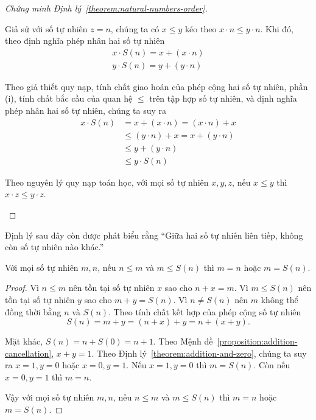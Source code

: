 \begin{proof}[Chứng minh Định lý~\ref{theorem:natural-numbers-order}]
\begin{enumerate}[label={(\roman*)}]
		      Giả sử với số tự nhiên $z = n$, chúng ta có $x\leq y$ kéo theo $x\cdot n\leq y\cdot n$. Khi đó, theo định nghĩa phép nhân hai số tự nhiên
		      \[
			      \begin{split}
				      x\cdot S(n) = x + (x\cdot n) \\
				      y\cdot S(n) = y + (y\cdot n)
			      \end{split}
		      \]

		      Theo giả thiết quy nạp, tính chất giao hoán của phép cộng hai số tự nhiên, phần (i), tính chất bắc cầu của quan hệ $\leq$ trên tập hợp số tự nhiên, và định nghĩa phép nhân hai số tự nhiên, chúng ta suy ra
		      \begin{align*}
			      x\cdot S(n) & = x + (x\cdot n) = (x\cdot n) + x    \\
			                  & \leq (y\cdot n) + x = x + (y\cdot n) \\
			                  & \leq y + (y\cdot n)                  \\
			                  & \leq y\cdot S(n)
		      \end{align*}

		      Theo nguyên lý quy nạp toán học, với mọi số tự nhiên $x, y, z$, nếu $x\leq y$ thì $x\cdot z\leq y\cdot z$.
	\end{enumerate}
\end{proof}

Định lý sau đây còn được phát biểu rằng ``Giữa hai số tự nhiên liên tiếp, không còn số tự nhiên nào khác.''
\begin{theorem}
	Với mọi số tự nhiên $m, n$, nếu $n\leq m$ và $m \leq S(n)$ thì $m = n$ hoặc $m = S(n)$.
\end{theorem}

\begin{proof}
	Vì $n\leq m$ nên tồn tại số tự nhiên $x$ sao cho $n + x = m$. Vì $m\leq S(n)$ nên tồn tại số tự nhiên $y$ sao cho $m + y = S(n)$. Vì $n\ne S(n)$ nên $m$ không thể đồng thời bằng $n$ và $S(n)$. Theo tính chất kết hợp của phép cộng số tự nhiên
	\[
		S(n) = m + y = (n + x) + y = n + (x + y).
	\]

	Mặt khác, $S(n) = n + S(0) = n + 1$. Theo Mệnh đề~\ref{proposition:addition-cancellation}, $x + y = 1$. Theo Định lý~\ref{theorem:addition-and-zero}, chúng ta suy ra $x = 1, y = 0$ hoặc $x = 0, y = 1$. Nếu $x = 1, y = 0$ thì $m = S(n)$. Còn nếu $x = 0, y = 1$ thì $m = n$.

	Vậy với mọi số tự nhiên $m, n$, nếu $n\leq m$ và $m \leq S(n)$ thì $m = n$ hoặc $m = S(n)$.
\end{proof}


